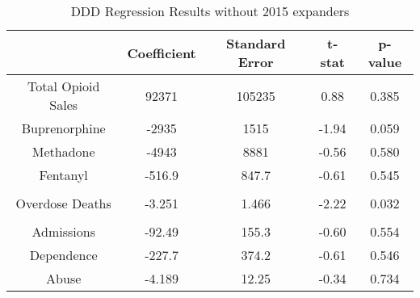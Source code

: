 \documentclass[11pt]{article}
\begin{document}
  \begin{table}[!h]
\centering
\caption{DDD Regression Results without 2015 expanders}
\label{DDD2}
\begin{tabular}{ccccc}
\hline
\textbf{} &
 \textbf{Coefficient} & \textbf{Standard Error} & {\textbf{t-stat}} & \textbf{p-value} \\ \hline
Total Opioid Sales & 92371 & 105235 & 0.88 & 0.385\\
Buprenorphine & -2935 & 1515 & -1.94 & 0.059\\
Methadone & -4943 & 8881 & -0.56 & 0.580\\
Fentanyl & -516.9 & 847.7 & -0.61 & 0.545\\

& & & & \\

Overdose Deaths & -3.251 & 1.466 & -2.22 & 0.032 \\ 

& & & & \\
Admissions & -92.49 & 155.3 & -0.60 & 0.554 \\
Dependence & -227.7 & 374.2 & -0.61 & 0.546\\
Abuse & -4.189 & 12.25 & -0.34 & 0.734\\

\hline
\end{tabular}
\end{table}
  
  
\end{document}
